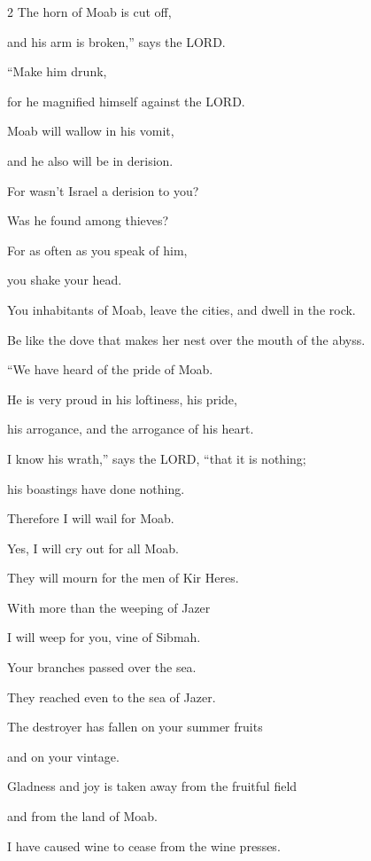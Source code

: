 \begin{multicols}{2}
\myverse{}The horn of Moab is cut off,

and his arm is broken,” says the LORD.

\vspace{\baselineskip}


\myverse{}“Make him drunk,

for he magnified himself against the LORD.

Moab will wallow in his vomit,

and he also will be in derision.


\myverse{}For wasn’t Israel a derision to you?

Was he found among thieves?

For as often as you speak of him,

you shake your head.


\myverse{}You inhabitants of Moab, leave the cities, and dwell in the
rock.

Be like the dove that makes her nest over the mouth of the abyss.

\vspace{\baselineskip}

\myverse{}“We have heard of the pride of Moab.

He is very proud in his loftiness, his pride,

his arrogance, and the arrogance of his heart.


\myverse{}I know his wrath,” says the LORD, “that it is nothing;

his boastings have done nothing.


\myverse{}Therefore I will wail for Moab.

Yes, I will cry out for all Moab.

They will mourn for the men of Kir Heres.


\myverse{}With more than the weeping of Jazer

I will weep for you, vine of Sibmah.

Your branches passed over the sea.

They reached even to the sea of Jazer.

The destroyer has fallen on your summer fruits

and on your vintage.


\myverse{}Gladness and joy is taken away from the fruitful field

and from the land of Moab.

I have caused wine to cease from the wine presses.


\end{multicols}
